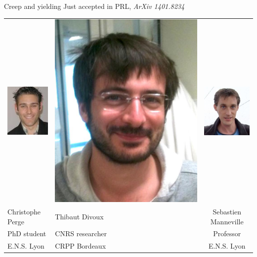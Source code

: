 \begin{frame}{Creep and yielding}
Just accepted in PRL, \textit{ArXiv 1401.8234}

\bigskip
{}

\bigskip
\begin{tabu}{X[c]X[c]c}
\includegraphics[height=0.3\textheight]{Chris}&
\includegraphics[height=0.3\textheight]{Thibaut}&
\includegraphics[height=0.3\textheight]{Seb}\\
Christophe Perge & Thibaut Divoux & Sebastien Manneville\\
PhD student & CNRS researcher & Professor\\
E.N.S. Lyon &  CRPP Bordeaux & E.N.S. Lyon\\
\end{tabu}



\end{frame}
